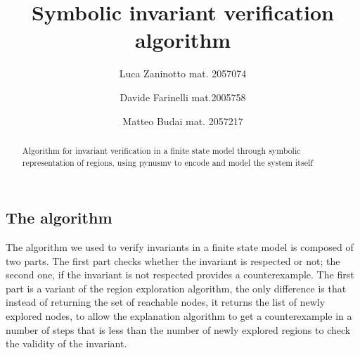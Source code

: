 \documentclass[9pt,oneside]{amsart}
\title{Symbolic invariant verification algorithm}
\author{
  Luca Zaninotto mat. 2057074 
  \and
  Davide Farinelli mat.2005758
  \and
  Matteo Budai mat. 2057217
}
\begin{document}
\begin{abstract}
  Algorithm for invariant verification in a finite state model through
  symbolic representation of regions, using pynusmv to encode and
  model the system itself
\end{abstract}
\maketitle
\setlength{\columnsep}{20pt}
\begin{multicols}{2}
\section{The algorithm}\label{algo}
The algorithm we used to verify invariants in a finite state model is
composed of two parts. The first part checks whether the invariant is
respected or not; the second one, if the invariant is not respected
provides a counterexample. The first part is a variant of the region
exploration algorithm, the only difference is that instead of returning
the set of reachable nodes, it returns the list of newly explored nodes,
to allow the explanation algorithm to get a counterexample in a number
of steps that is less than the number of newly explored regions to check
the validity of the invariant.


\end{multicols}
\end{document}
